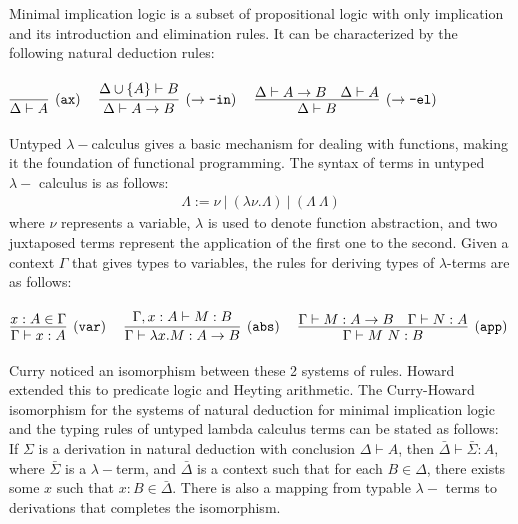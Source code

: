 \documentclass{article}
\begin{document}
	Minimal implication logic is a subset
	of propositional logic with only 
	implication and its introduction 
	and elimination rules. It can be 
	characterized by the following 
	natural deduction rules:\\ \\
	\begin{math}
		\infer[(\texttt{ax})]{\Delta \vdash A}{}
		\ \ \ \ 
		\infer[(\to\texttt{-in})]{\Delta \vdash A \to B}
		{\Delta \cup \{A\} \vdash B}
		\ \ \ \ 
		\infer[(\to\texttt{-el})]{\Delta \vdash B}
		{\Delta \vdash A \to B & \Delta \vdash A}
	\end{math} 
	\\ \\
	Untyped $\lambda-$calculus gives a basic 
	mechanism for dealing with functions, making 
	it the foundation of functional programming.
	The syntax of terms in untyped $\lambda-$
	calculus is as follows:
	\begin{align*}
		\Lambda := \nu\ |\ (\lambda \nu.\Lambda)
		\ |\ (\Lambda\ \Lambda)
	\end{align*}  
	where $\nu$ represents a variable, $\lambda$ 
	is used to denote function abstraction, 
	and two juxtaposed terms represent the 
	application of the first one to the second.
	Given a context $\Gamma$ that gives types 
	to variables, the rules for deriving 
	types of $\lambda$-terms are as follows: \\ \\
	\begin{math}
		\infer[(\texttt{var})]{\Gamma \vdash x : A}
		{x : A \in \Gamma}
		\ \ \ \ 
		\infer[(\texttt{abs})]
		{\Gamma \vdash \lambda x. M : A \to B}
		{\Gamma, x : A \vdash M : B}
		\ \ \ \ 
		\infer[(\texttt{app})]{\Gamma \vdash M\ N : B}
		{\Gamma \vdash M : A \to B & \Gamma \vdash N : A}
	\end{math} 
	\\ \\
	Curry noticed an isomorphism between these 
	2 systems of rules. Howard extended this to 
	predicate logic and Heyting arithmetic. The 
	Curry-Howard isomorphism for the systems 
	of natural deduction for minimal implication 
	logic and the typing rules of untyped lambda 
	calculus terms can be stated as follows:\\

	\noindent If $\Sigma$ is a derivation in natural 
	deduction with conclusion $\Delta \vdash A$,
	then $\bar{\Delta} \vdash \bar{\Sigma} : A$,\\
	
	\noindent where $\bar{\Sigma}$ is a 
	$\lambda-$term,	and $\bar{\Delta}$ is a 
	context such that for each $B \in \Delta$, 
	there exists some $x$ such that 
	$x : B \in \bar{\Delta}$. There 
	is also a mapping from typable $\lambda-$ terms
	to derivations that completes the isomorphism.
	
\end{document}
